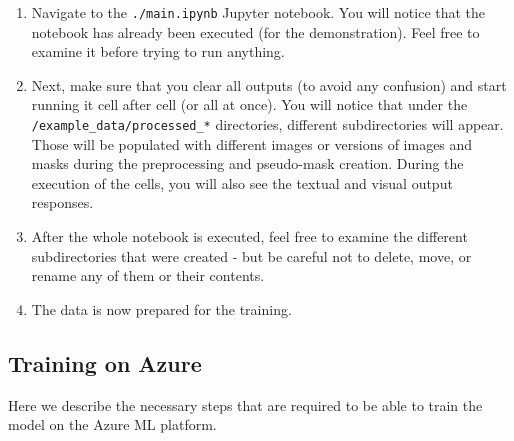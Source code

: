 \begin{enumerate}
\item
  Navigate to the \texttt{./main.ipynb} Jupyter notebook.
  You will notice that the notebook has already been executed (for the
  demonstration). Feel free to examine it before trying to run anything.
\item
  Next, make sure that you clear all outputs (to avoid any confusion)
  and start running it cell after cell (or all at once). You will notice
  that under the \texttt{/example\_data/processed\_*} directories,
  different subdirectories will appear. Those will be populated with
  different images or versions of images and masks during the
  preprocessing and pseudo-mask creation. During the execution of the
  cells, you will also see the textual and visual output responses.
\item
  After the whole notebook is executed, feel free to examine the different
  subdirectories that were created - but be careful not to delete, move,
  or rename any of them or their contents.
\item
  The data is now prepared for the training.
\end{enumerate}

\subsection{Training on Azure}\label{a-training-on-azure}

Here we describe the necessary steps that are required to be
able to train the model on the Azure ML platform.

